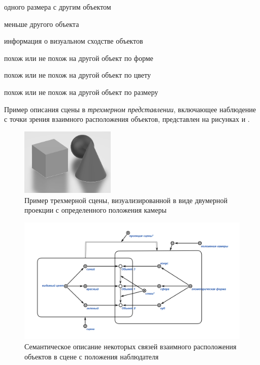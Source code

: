 \begin{textitemize}
\begin{textitemize}
        \item одного размера с другим объектом
        \item меньше другого объекта
    \end{textitemize}
    \item информация о визуальном сходстве объектов
    \begin{textitemize}
        \item похож или не похож на другой объект по форме
        \item похож или не похож на другой объект по цвету
        \item похож или не похож на другой объект по размеру
    \end{textitemize}
\end{textitemize}


Пример описания сцены в \textit{трехмерном представлении}, включающее наблюдение с точки зрения взаимного расположения объектов, представлен на рисунках \textit{} и \textit{}.

\begin{figure}[H]
    \includegraphics[scale=0.8, width=0.4\textwidth]{author/part4/figures/scene-example.png}
    \caption{Пример трехмерной сцены, визуализированной в виде двумерной проекции с определенного положения камеры}
    \label{fig:scene-example}
\end{figure}

\begin{figure}[H]
    \includegraphics[scale=0.8, width=1.0\textwidth]{author/part4/figures/scene-description.png}
    \caption{Семантическое описание некоторых связей взаимного расположения объектов в сцене с положения наблюдателя}
    \label{fig:scene-description}
\end{figure}


